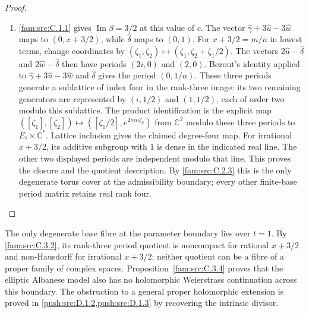 \begin{proof}
\begin{enumerate}[label=\arabic*.,leftmargin=*]
\item \ref{fam:src:C.1.1} gives \(\operatorname{Im}\beta=3/2\) at this value of \(c\).
The vector \(\widehat\gamma+3\widehat u-3\widehat w\) maps to
\((0,x+3/2)\), while \(\widehat\delta\) maps to \((0,1)\).
For $x+3/2=m/n$ in lowest terms, change coordinates by
$(\zeta_1,\zeta_2)\mapsto(\zeta_1,\zeta_2+\zeta_1/2)$.
The vectors $2\widehat u-\widehat\delta$ and
$2\widehat w-\widehat\delta$ then have periods $(2i,0)$ and $(2,0)$.
Bezout's identity applied to $\widehat\gamma+3\widehat u-3\widehat w$
and $\widehat\delta$ gives the period $(0,1/n)$.
These three periods generate a sublattice of index four in the rank-three
image: its two remaining generators are represented by
$(i,1/2)$ and $(1,1/2)$, each of order two modulo this sublattice.
The product identification is the explicit map
$([\zeta_1],[\zeta_2])\mapsto([\zeta_1/2],e^{2\pi in\zeta_2})$
from $\mathbb C^2$ modulo these three periods to $E_i\times\mathbb C^*$. Lattice inclusion gives the claimed degree-four map.
For irrational $x+3/2$, its additive subgroup with $1$ is dense in the
indicated real line. The other two displayed periods are independent
modulo that line. This proves the closure and the quotient description.
By \ref{fam:src:C.2.3} this is the only degenerate torus cover at the admissibility
boundary; every other finite-base period matrix retains real rank four.
\end{enumerate}
\end{proof}


\begin{remark}\hypertarget{tag-01QO}{}\label{fam:src:C.3.3}\label{fam:st:C.3.3}

The only degenerate base fibre at the parameter boundary lies over $t=1$.
By \ref{fam:src:C.3.2}, its rank-three period quotient is noncompact for
rational $x+3/2$ and non-Hausdorff for irrational $x+3/2$; neither quotient
can be a fibre of a proper family of complex spaces.
Proposition~\ref{fam:src:C.3.4} proves that the elliptic Albanese model
also has no holomorphic Weierstrass continuation across this boundary.
The obstruction to a general proper holomorphic extension is proved in
\cref{push:src:D.1.2,push:src:D.1.3} by recovering the intrinsic divisor.
\end{remark}

